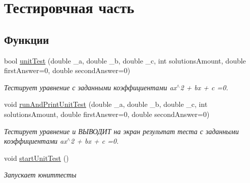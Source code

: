 \hypertarget{group___unit_test}{
\section{Тестировчная часть}
\label{group___unit_test}
}
\subsection*{Функции}
\begin{DoxyCompactItemize}
\item 
bool \hyperlink{group___unit_test_ga75351e3c1b1ef88c42a84615af4ba144}{unitTest} (double \_\-a, double \_\-b, double \_\-c, int solutionsAmount, double firstAnswer=0, double secondAnswer=0)
\begin{DoxyCompactList}\small\item\em Тестирует уравнение с заданными коэффициентами ax$^\wedge$2 + bx + c =0. \item\end{DoxyCompactList}\item 
void \hyperlink{group___unit_test_gacc379c6d974599da56ffecfec5ea5eaf}{runAndPrintUnitTest} (double \_\-a, double \_\-b, double \_\-c, int solutionsAmount, double firstAnswer=0, double secondAnswer=0)
\begin{DoxyCompactList}\small\item\em Тестирует уравнение и ВЫВОДИТ на экран результат теста с заданными коэффициентами ax$^\wedge$2 + bx + c =0. \item\end{DoxyCompactList}\item 
\hypertarget{group___unit_test_ga5c75c8ab53dd22e5006193e19638e838}{
void \hyperlink{group___unit_test_ga5c75c8ab53dd22e5006193e19638e838}{startUnitTest} ()}
\label{group___unit_test_ga5c75c8ab53dd22e5006193e19638e838}

\begin{DoxyCompactList}\small\item\em Запускает юниттесты \item\end{DoxyCompactList}\end{DoxyCompactItemize}


